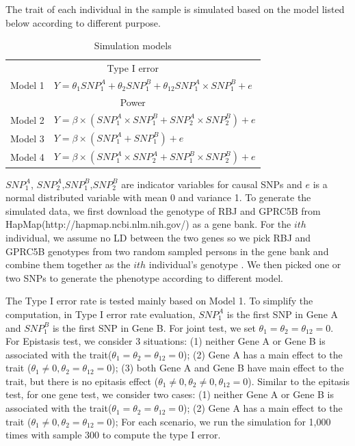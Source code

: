 \documentclass{article}
\begin{document}
        The trait of each individual in the sample is simulated based on the model listed below according to different purpose.
        \begin{table}[htbp]
            \centering
            \caption{Simulation models}
            \begin{tabular}{c|l}
                \toprule
                \multicolumn{2}{c}{Type I error}\\
                 Model 1 & $Y = \theta_1SNP^A_1+\theta_2SNP^B_1+\theta_{12}SNP^A_1\times SNP^B_1 +e$\\
                \midrule
                \multicolumn{2}{c}{Power}\\
                Model 2 & $Y =\beta\times (SNP^A_1\times SNP^B_1+SNP^A_2\times SNP^B_2)+e$  \\
                Model 3 & $Y =\beta\times (SNP^A_1+SNP^B_1)+e$\\
                Model 4 & $Y =\beta\times (SNP^A_1\times SNP^A_2+SNP^B_1\times SNP^B_2)+e$\\
                \bottomrule
            \end{tabular}
        \end{table}
        $SNP^A_1$, $SNP^A_2$,$SNP^B_1$,$SNP^B_2$ are indicator variables for causal SNPs and $e$ is a normal distributed variable with mean 0 and variance 1. To generate the simulated data, we first download the genotype of RBJ and GPRC5B from HapMap(http://hapmap.ncbi.nlm.nih.gov/) as a gene bank. For the $ith$ individual, we assume no LD between the two genes so we pick RBJ and GPRC5B genotypes from two random sampled persons in the gene bank and combine them together as the $ith$ individual's genotype . We then picked one or two SNPs to generate the phenotype according to different model.

        The Type I error rate is tested mainly based on Model 1. To simplify the computation, in Type I error rate evaluation, $SNP^A_1$ is the first SNP in Gene A and $SNP^B_1$ is the first SNP in Gene B. For joint test, we set $\theta_1=\theta_2=\theta_{12}=0$. For Epistasis test, we consider 3 situations: (1) neither Gene A or Gene B is associated with the trait($\theta_1=\theta_2=\theta_{12}=0$); (2) Gene A has a main effect to the trait ($\theta_1\neq0,\theta_2=\theta_{12}=0$); (3) both Gene A and Gene B have main effect to the trait, but there is no epitasis effect ($\theta_1\neq0,\theta_2\neq0,\theta_{12}=0$). Similar to the epitasis test, for one gene test, we consider two cases: (1) neither Gene A or Gene B is associated with the trait($\theta_1=\theta_2=\theta_{12}=0$); (2) Gene A has a main effect to the trait ($\theta_1\neq0,\theta_2=\theta_{12}=0$); For each scenario, we run the simulation for 1,000 times with sample 300 to compute the type I error.
\end{document}
